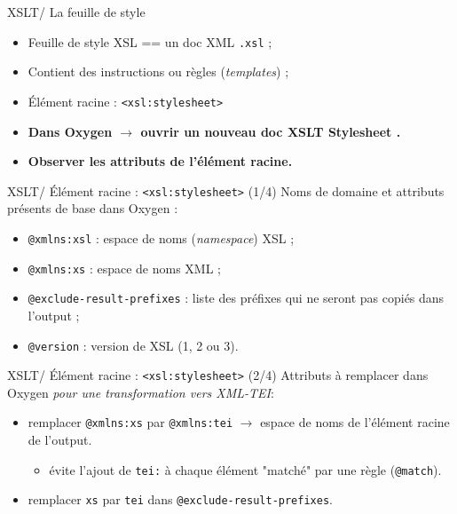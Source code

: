 \documentclass{beamer}
\begin{document}
    \begin{frame}{XSLT/ La feuille de style}
    \Large
        \begin{itemize}
            \item Feuille de style XSL == un doc XML \texttt{.xsl} ;
            \item Contient des instructions ou règles (\textit{templates})  ;
            \item Élément racine : \texttt{<xsl:stylesheet>}
        \end{itemize}
        \bigskip
        \bigskip
        \begin{itemize}
            \item \textbf{Dans Oxygen $\rightarrow$ ouvrir un nouveau doc \og XSLT Stylesheet \fg.}
            \item \textbf{Observer les attributs de l'élément racine.}
        \end{itemize}
    \end{frame}

    \begin{frame}{XSLT/ Élément racine : \texttt{<xsl:stylesheet>} (1/4)}
    \Large
    Noms de domaine et attributs présents de base dans Oxygen :
        \begin{itemize}
            \item \texttt{@xmlns:xsl} : espace de noms (\textit{namespace}) XSL ;
            \item \texttt{@xmlns:xs} : espace de noms XML ;
            \item \texttt{@exclude-result-prefixes} : liste des préfixes qui ne seront pas copiés dans l'output ;
            \item \texttt{@version} : version de XSL (1, 2 ou 3).
        \end{itemize}
    \end{frame}

    \begin{frame}{XSLT/ Élément racine : \texttt{<xsl:stylesheet>} (2/4)}
    \Large Attributs à remplacer dans Oxygen \textit{pour une transformation vers XML-TEI}:
        \begin{itemize}
            \item remplacer \texttt{@xmlns:xs} par \texttt{@xmlns:tei} $\rightarrow$ espace de noms de l'élément racine de l'output.
            \begin{itemize}
            \large
                \item évite l'ajout de \texttt{tei:} à chaque élément "matché" par une règle (\texttt{@match}).
            \end{itemize}
            \bigskip
            \item remplacer \texttt{xs} par \texttt{tei} dans \texttt{@exclude-result-prefixes}.
        \end{itemize}
    \end{frame}
\end{document}
